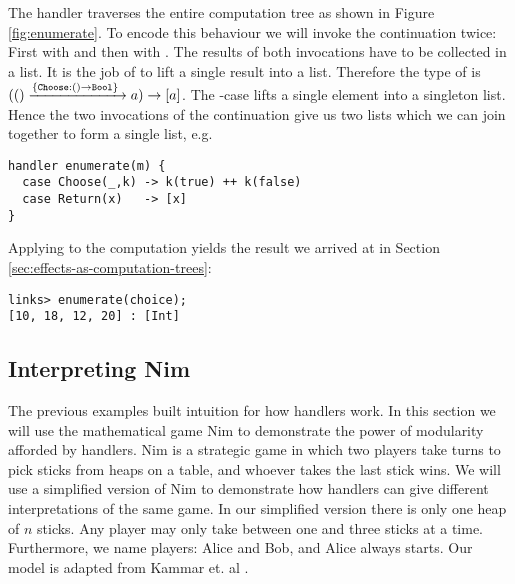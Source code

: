 \begin{example}\label{ex:enumerate}
The handler  traverses the entire computation tree as shown in Figure \ref{fig:enumerate}. To encode this behaviour we will invoke the continuation twice: First with  and then with . The results of both invocations have to be collected in a list. It is the job of  to lift a single result into a list. Therefore the type of  is 
$(() \xrightarrow{\{\texttt{Choose}:() \to \texttt{Bool}\}\;} a) \to [a]$.
The -case lifts a single element into a singleton list. Hence the two invocations of the continuation give us two lists which we can join together to form a single list, e.g.
\begin{lstlisting}[style=links]
handler enumerate(m) {
  case Choose(_,k) -> k(true) ++ k(false)
  case Return(x)   -> [x]
}
\end{lstlisting}
Applying  to the computation  yields the result we arrived at in Section \ref{sec:effects-as-computation-trees}:
\begin{lstlisting}[style=links]
links> enumerate(choice);
[10, 18, 12, 20] : [Int]
\end{lstlisting}
\end{example}

\subsection{Interpreting Nim}\label{sec:interpreting-nim}
The previous examples built intuition for how handlers work. In this section we will use the mathematical game Nim to demonstrate the power of modularity afforded by handlers. Nim is a strategic game in which two players take turns to pick sticks from heaps on a table, and whoever takes the last stick wins.
We will use a simplified version of Nim to demonstrate how handlers can give different interpretations of the same game. In our simplified version there is only one heap of $n$ sticks. Any player may only take between one and three sticks at a time. Furthermore, we name players: Alice and Bob, and Alice always starts. Our model is adapted from Kammar et. al \cite{Kammar2013}.

